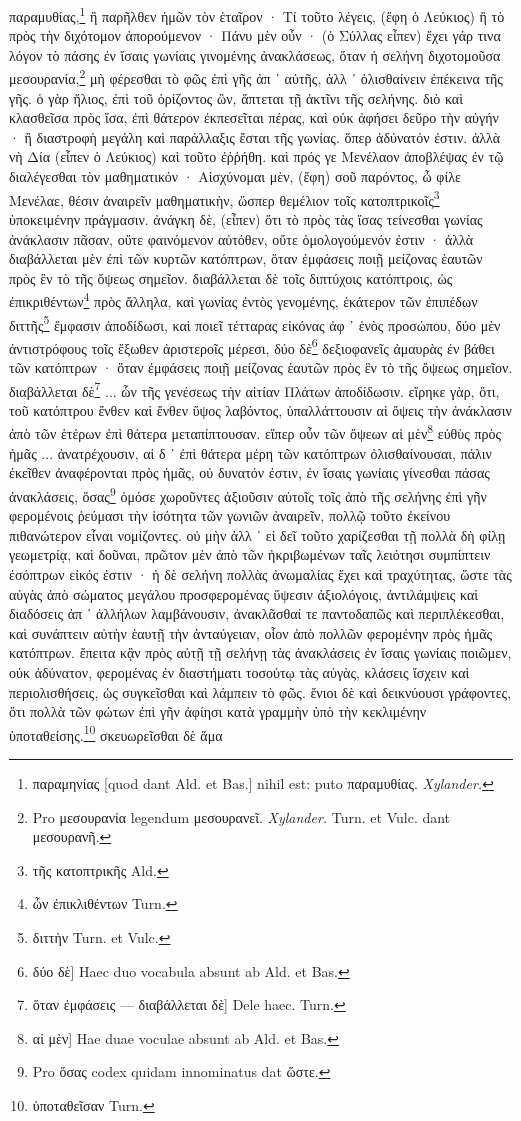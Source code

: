 \documentclass[a4paper, 11pt, oneside, polutonikogreek, german]{article}
\begin{document}
παραμυθίας,\footnote{παραμηνίας [quod dant Ald. et Bas.] nihil est: puto παραμυθίας. \emph{Xylander.}} ἢ παρῆλθεν ἡμῶν τὸν ἑταῖρον · Τί τοῦτο λέγεις, (ἔφη ὁ Λεύκιος) ἢ τὸ πρὸς τὴν διχότομον ἀπορούμενον · Πάνυ μὲν οὖν · (ὁ Σύλλας εἶπεν) ἔχει γάρ τινα λόγον τὸ πάσης ἐν ἴσαις γωνίαις γινομένης ἀνακλάσεως, ὅταν ἡ σελήνη διχοτομοῦσα μεσουρανία,\footnote{Pro μεσουρανία legendum μεσουρανεῖ. \emph{Xylander.} Turn. et Vulc. dant μεσουρανῆ.} μὴ φέρεσθαι τὸ φῶς ἐπὶ γῆς ἀπ ᾽ αὐτῆς, ἀλλ ᾽ ὀλισθαίνειν ἐπέκεινα τῆς γῆς. ὁ γὰρ ἥλιος, ἐπὶ τοῦ ὁρίζοντος ὢν, ἅπτεται τῇ ἀκτῖνι τῆς σελήνης. διὸ καὶ κλασθεῖσα πρὸς ἴσα, ἐπὶ θάτερον ἐκπεσεῖται πέρας, καὶ οὐκ ἀφήσει δεῦρο τὴν αὐγήν · ἢ διαστροφὴ μεγάλη καὶ παράλλαξις ἔσται τῆς γωνίας. ὅπερ ἀδύνατόν ἐστιν. ἀλλὰ νὴ Δία (εἶπεν ὁ Λεύκιος) καὶ τοῦτο ἐῤῥήθη. καὶ πρός γε Μενέλαον ἀποβλέψας ἐν τῷ διαλέγεσθαι τὸν μαθηματικόν · Αἰσχύνομαι μὲν, (ἔφη) σοῦ παρόντος, ὦ φίλε Μενέλαε, θέσιν ἀναιρεῖν μαθηματικὴν, ὥσπερ θεμέλιον τοῖς κατοπτρικοῖς\footnote{τῆς κατοπτρικῆς Ald.} ὑποκειμένην πράγμασιν. ἀνάγκη δὲ, (εἶπεν) ὅτι τὸ πρὸς τὰς ἴσας τείνεσθαι γωνίας ἀνάκλασιν πᾶσαν, οὔτε φαινόμενον αὐτόθεν, οὔτε ὁμολογούμενόν ἐστιν · ἀλλὰ διαβάλλεται μὲν ἐπὶ τῶν κυρτῶν κατόπτρων, ὅταν ἐμφάσεις ποιῇ μείζονας ἑαυτῶν πρὸς ἓν τὸ τῆς ὄψεως σημεῖον. διαβάλλεται δὲ τοῖς διπτύχοις κατόπτροις, ὡς ἐπικριθέντων\footnote{ὧν ἐπικλιθέντων Turn.} πρὸς ἄλληλα, καὶ γωνίας ἐντὸς γενομένης, ἑκάτερον τῶν ἐπιπέδων διττῆς\footnote{διττὴν Turn. et Vulc.} ἔμφασιν ἀποδίδωσι, καὶ ποιεῖ τέτταρας εἰκόνας ἀφ ᾽ ἑνὸς προσώπου, δύο μὲν ἀντιστρόφους τοῖς ἔξωθεν ἀριστεροῖς μέρεσι, δύο δὲ\footnote{δύο δὲ] Haec duo vocabula absunt ab Ald. et Bas.} δεξιοφανεῖς ἀμαυρὰς ἐν βάθει τῶν κατόπτρων · ὅταν ἐμφάσεις ποιῇ μείζονας ἑαυτῶν πρὸς ἓν τὸ τῆς ὄψεως σημεῖον. διαβάλλεται δὲ\footnote{ὅταν ἐμφάσεις --- διαβάλλεται δὲ] Dele haec. Turn.} ... ὧν τῆς γενέσεως τὴν αἰτίαν Πλάτων ἀποδίδωσιν. εἴρηκε γὰρ, ὅτι, τοῦ κατόπτρου ἔνθεν καὶ ἔνθεν ὕψος λαβόντος, ὑπαλλάττουσιν αἱ ὄψεις τὴν ἀνάκλασιν ἀπὸ τῶν ἑτέρων ἐπὶ θάτερα μεταπίπτουσαν. εἴπερ οὖν τῶν ὄψεων αἱ μὲν\footnote{αἱ μὲν] Hae duae voculae absunt ab Ald. et Bas.} εὐθὺς πρὸς ἡμᾶς ... ἀνατρέχουσιν, αἱ δ ᾽ ἐπὶ θάτερα μέρη τῶν κατόπτρων ὀλισθαίνουσαι, πάλιν ἐκεῖθεν ἀναφέρονται πρὸς ἡμᾶς, οὐ δυνατόν ἐστιν, ἐν ἴσαις γωνίαις γίνεσθαι πάσας ἀνακλάσεις, ὅσας\footnote{Pro ὅσας codex quidam innominatus dat ὥστε.} ὁμόσε χωροῦντες ἀξιοῦσιν αὐτοῖς τοῖς ἀπὸ τῆς σελήνης ἐπὶ γῆν φερομένοις ῥεύμασι τὴν ἰσότητα τῶν γωνιῶν ἀναιρεῖν, πολλῷ τοῦτο ἐκείνου πιθανώτερον εἶναι νομίζοντες. οὐ μὴν ἀλλ ᾽ εἰ δεῖ τοῦτο χαρίζεσθαι τῇ πολλὰ δὴ φίλῃ γεωμετρίᾳ, καὶ δοῦναι, πρῶτον μὲν ἀπὸ τῶν ἠκριβωμένων ταῖς λειότησι συμπίπτειν ἐσόπτρων εἰκός ἐστιν · ἡ δὲ σελήνη πολλὰς ἀνωμαλίας ἔχει καὶ τραχύτητας, ὥστε τὰς αὐγὰς ἀπὸ σώματος μεγάλου προσφερομένας ὕψεσιν ἀξιολόγοις, ἀντιλάμψεις καὶ διαδόσεις ἀπ ᾽ ἀλλήλων λαμβάνουσιν, ἀνακλᾶσθαί τε παντοδαπῶς καὶ περιπλέκεσθαι, καὶ συνάπτειν αὐτὴν ἑαυτῇ τὴν ἀνταύγειαν, οἷον ἀπὸ πολλῶν φερομένην πρὸς ἡμᾶς κατόπτρων. ἔπειτα κᾂν πρὸς αὐτῇ τῇ σελήνῃ τὰς ἀνακλάσεις ἐν ἴσαις γωνίαις ποιῶμεν, οὐκ ἀδύνατον, φερομένας ἐν διαστήματι τοσούτῳ τὰς αὐγὰς, κλάσεις ἴσχειν καὶ περιολισθήσεις, ὡς συγκεῖσθαι καὶ λάμπειν τὸ φῶς. ἔνιοι δὲ καὶ δεικνύουσι γράφοντες, ὅτι πολλὰ τῶν φώτων ἐπὶ γῆν ἀφίησι κατὰ γραμμὴν ὑπὸ τὴν κεκλιμένην ὑποταθείσης.\footnote{ὑποταθεῖσαν Turn.} σκευωρεῖσθαι δὲ ἅμα 
\end{document}
